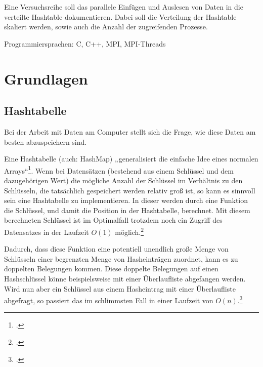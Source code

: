 \documentclass{scrreprt}
\begin{document}
Eine Versuchsreihe soll das parallele Einfügen und Auslesen von Daten in die verteilte Hashtable dokumentieren. Dabei soll die Verteilung der Hashtable skaliert werden, sowie auch die Anzahl der zugreifenden Prozesse.

Programmiersprachen: C, C++, MPI, MPI-Threads


\chapter{Grundlagen}

\section{Hashtabelle}
\label{sec:hashtable}
Bei der Arbeit mit Daten am Computer stellt sich die Frage, wie diese Daten am besten abzuspeichern sind. 

Eine Hashtabelle (auch: HashMap) „generalisiert die einfache Idee eines normalen Arrays“\footcite{cormen2009introduction}. Wenn bei Datensätzen (bestehend aus einem Schlüssel und dem dazugehörigen Wert) die mögliche Anzahl der Schlüssel im Verhältnis zu den Schlüsseln, die tatsächlich gespeichert werden relativ groß ist, so kann es sinnvoll sein eine Hashtabelle zu implementieren. In dieser werden durch eine Funktion die Schlüssel, und damit die Position in der Hashtabelle, berechnet. Mit diesem berechneten Schlüssel ist im Optimalfall trotzdem noch ein Zugriff des Datensatzes in der Laufzeit $O(1)$ möglich.\footcite{cormen2009introduction}

Dadurch, dass diese Funktion eine potentiell unendlich große Menge von Schlüsseln einer begrenzten Menge von Hasheinträgen zuordnet, kann es zu doppelten Belegungen kommen. Diese doppelte Belegungen auf einen Hashschlüssel könne beispielsweise mit einer Überlaufliste abgefangen werden. Wird nun aber ein Schlüssel aus einem Hasheintrag mit einer Überlaufliste abgefragt, so passiert das im schlimmsten Fall in einer Laufzeit von $O(n)$.\footcite{cormen2009introduction}
\end{document}
